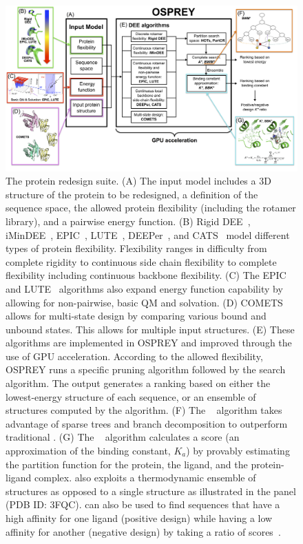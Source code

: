 \begin{figure}
\center
\includegraphics[width=6in]{figures/osprey_mantra.png}
 \vspace{-0.3in}%
\caption{The \osprey protein redesign suite. (A) The input model includes a 3D structure of the protein to be redesigned, a definition of the sequence space, the allowed protein flexibility (including the rotamer library), and a pairwise energy function. (B) Rigid DEE~\cite{DEE,DEE/A*}, iMinDEE~\cite{iMinDEE}, EPIC~\cite{EPIC}, LUTE~\cite{LUTE_RECOMB}, DEEPer~\cite{DEEPer}, and CATS~\cite{CATS} model different types of protein flexibility. Flexibility ranges in difficulty from complete rigidity to continuous side chain flexibility to complete flexibility including continuous backbone flexibility. (C) The EPIC~\cite{EPIC} and LUTE~\cite{LUTE_RECOMB} algorithms also expand energy function capability by allowing for non-pairwise, basic QM and solvation. (D) COMETS~\cite{COMETS} allows for multi-state design by comparing various bound and unbound states. This allows for multiple input structures. (E) These algorithms are implemented in OSPREY and improved through the use of GPU acceleration. According to the allowed flexibility, OSPREY runs a specific pruning algorithm followed by the \as search algorithm. The \as output generates a ranking based on either the lowest-energy structure of each sequence, or an ensemble of structures computed by the \ks algorithm. (F) The \bwmstar~\cite{BWM*} algorithm takes advantage of sparse trees and branch decomposition to outperform traditional \as. (G) The \ks~\cite{K*,minDEE} algorithm calculates a \ks score (an approximation of the binding constant, $K_a$) by provably estimating the partition function for the protein, the ligand, and the protein-ligand complex. \ks also exploits a thermodynamic ensemble of structures as opposed to a single structure as illustrated in the panel (PDB ID: 3FQC). \ks can also be used to find sequences that have a high affinity for one ligand (positive design) while having a low affinity for another (negative design) by taking a ratio of \ks scores~\cite{DHFR-PNAS,DHFR-PNAS2}. }
\label{flowchart}
\end{figure}

